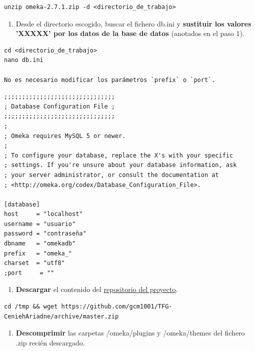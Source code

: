 \documentclass[
]{article}
\providecommand{\tightlist}{%
  \setlength{\itemsep}{0pt}\setlength{\parskip}{0pt}}
\begin{document}
\begin{verbatim}
unzip omeka-2.7.1.zip -d <directorio_de_trabajo>
\end{verbatim}

\begin{enumerate}
\def\labelenumi{\arabic{enumi}.}
\setcounter{enumi}{3}
\tightlist
\item
  Desde el directorio escogido, buscar el fichero {db.ini} y
  \textbf{sustituir los valores 'XXXXX' por los datos de la base de
  datos} (anotados en el paso 1).
\end{enumerate}

\begin{verbatim}
cd <directorio_de_trabajo>
nano db.ini

No es necesario modificar los parámetros `prefix` o `port`.
\end{verbatim}

\begin{verbatim}
;;;;;;;;;;;;;;;;;;;;;;;;;;;;;;;
; Database Configuration File ;
;;;;;;;;;;;;;;;;;;;;;;;;;;;;;;;
;
; Omeka requires MySQL 5 or newer.
;
; To configure your database, replace the X's with your specific
; settings. If you're unsure about your database information, ask
; your server administrator, or consult the documentation at
; <http://omeka.org/codex/Database_Configuration_File>.

[database]
host     = "localhost"
username = "usuario"
password = "contraseña"
dbname   = "omekadb"
prefix   = "omeka_"
charset  = "utf8"
;port     = ""
\end{verbatim}

\begin{enumerate}
\def\labelenumi{\arabic{enumi}.}
\setcounter{enumi}{4}
\tightlist
\item
  \textbf{Descargar} el contenido del
  \href{https://github.com/gcm1001/TFG-CeniehAriadne}{repositorio del
  proyecto}.
\end{enumerate}

\begin{verbatim}
cd /tmp && wget https://github.com/gcm1001/TFG-CeniehAriadne/archive/master.zip
\end{verbatim}

\begin{enumerate}
\def\labelenumi{\arabic{enumi}.}
\setcounter{enumi}{5}
\tightlist
\item
  \textbf{Descomprimir} las carpetas {/omeka/plugins} y {/omeka/themes}
  del fichero {.zip} recién descargado.
\end{enumerate}
\end{document}
